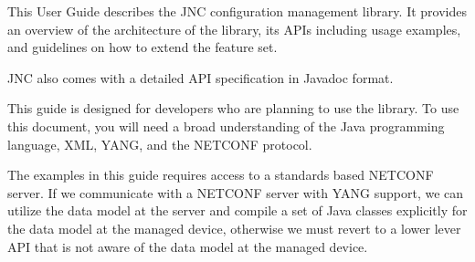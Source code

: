 \documentclass[a4paper,12pt]{memoir}
\begin{document}
This User Guide describes the JNC configuration management library. It provides an overview of
the architecture of the library, its APIs including usage examples, and guidelines on how to extend
the feature set.

JNC also comes with a detailed API specification in Javadoc format.

This guide is designed for developers who are planning to use the library. To use this document, you will
need a broad understanding of the Java programming language, XML, YANG, and the NETCONF
protocol.

The examples in this guide requires access to a standards based NETCONF server. If we communicate
with a NETCONF server with YANG support, we can utilize the data model at the server and compile a set of
Java classes explicitly for the data model at the managed device, otherwise we must revert to a lower lever API that is
not aware of the data model at the managed device.
\end{document}
